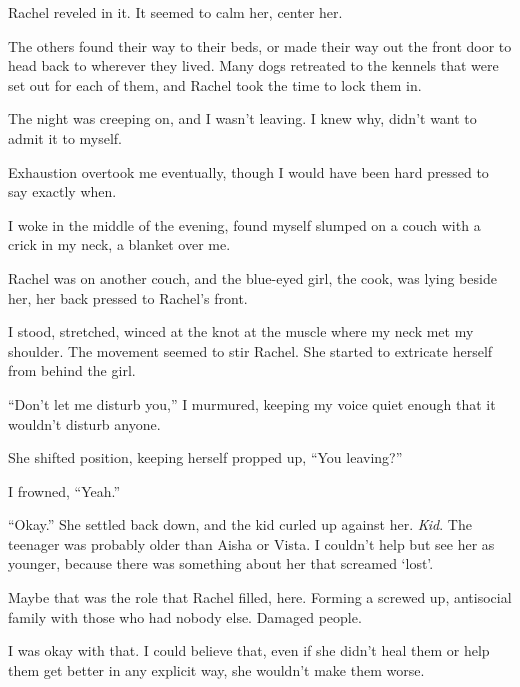 Rachel reveled in it.  It seemed to calm her, center her.



The others found their way to their beds, or made their way out the front door to head back to wherever they lived.  Many dogs retreated to the kennels that were set out for each of them, and Rachel took the time to lock them in.



The night was creeping on, and I wasn't leaving.  I knew why, didn't want to admit it to myself.



Exhaustion overtook me eventually, though I would have been hard pressed to say exactly when.



I woke in the middle of the evening, found myself slumped on a couch with a crick in my neck, a blanket over me.



Rachel was on another couch, and the blue-eyed girl, the cook, was lying beside her, her back pressed to Rachel's front.



I stood, stretched, winced at the knot at the muscle where my neck met my shoulder.  The movement seemed to stir Rachel.  She started to extricate herself from behind the girl.



``Don't let me disturb you,'' I murmured, keeping my voice quiet enough that it wouldn't disturb anyone.



She shifted position, keeping herself propped up, ``You leaving?''



I frowned, ``Yeah.''



``Okay.''  She settled back down, and the kid curled up against her.  \emph{Kid}.  The teenager was probably older than Aisha or Vista.  I couldn't help but see her as younger, because there was something about her that screamed `lost'.



Maybe that was the role that Rachel filled, here.  Forming a screwed up, antisocial family with those who had nobody else.  Damaged people.



I was okay with that.  I could believe that, even if she didn't heal them or help them get better in any explicit way, she wouldn't make them worse.



